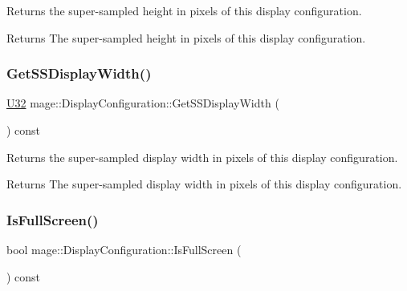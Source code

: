 Returns the super-\/sampled height in pixels of this display configuration.

\begin{DoxyReturn}{Returns}
The super-\/sampled height in pixels of this display configuration. 
\end{DoxyReturn}
\hypertarget{structmage_1_1_display_configuration_a68418c385c806d3b344c8818f34f9ba2}{}\label{structmage_1_1_display_configuration_a68418c385c806d3b344c8818f34f9ba2} 
\subsubsection{\texorpdfstring{Get\+S\+S\+Display\+Width()}{GetSSDisplayWidth()}}
{\footnotesize\ttfamily \hyperlink{namespacemage_a41c104c036fba3756a74e19f793eeaa1}{U32} mage\+::\+Display\+Configuration\+::\+Get\+S\+S\+Display\+Width (\begin{DoxyParamCaption}{ }\end{DoxyParamCaption}) const\hspace{0.3cm}{\ttfamily [noexcept]}}

Returns the super-\/sampled display width in pixels of this display configuration.

\begin{DoxyReturn}{Returns}
The super-\/sampled display width in pixels of this display configuration. 
\end{DoxyReturn}
\hypertarget{structmage_1_1_display_configuration_ab984b32ff2b6ce6a376aa09399b9b45e}{}\label{structmage_1_1_display_configuration_ab984b32ff2b6ce6a376aa09399b9b45e} 
\subsubsection{\texorpdfstring{Is\+Full\+Screen()}{IsFullScreen()}}
{\footnotesize\ttfamily bool mage\+::\+Display\+Configuration\+::\+Is\+Full\+Screen (\begin{DoxyParamCaption}{ }\end{DoxyParamCaption}) const\hspace{0.3cm}{\ttfamily [noexcept]}}

